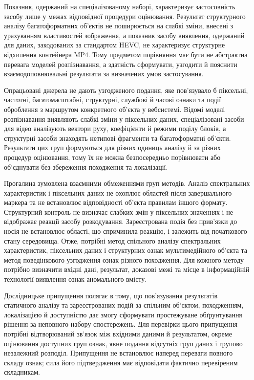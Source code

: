 Показник, одержаний на спеціалізованому наборі, характеризує застосовність засобу лише у межах відповідної процедури оцінювання. Результат структурного аналізу багатоформатних об’єктів не поширюється на слабкі зміни, внесені з урахуванням властивостей зображення, а показник засобу виявлення, одержаний для даних, закодованих за стандартом HEVC, не характеризує структурне відхилення контейнера MP4. Тому предметом порівняння має бути не абстрактна перевага моделей розпізнавання, а здатність сформувати, узгодити й пояснити взаємодоповнювальні результати за визначених умов застосування.

Опрацьовані джерела не дають узгодженого подання, яке пов’язувало б піксельні, частотні, багатомасштабні, структурні, службові й часові ознаки та події оброблення з маршрутом конкретного об’єкта у вебсистемі. Відомі моделі розпізнавання виявляють слабкі зміни у піксельних даних, спеціалізовані засоби для відео аналізують вектори руху, коефіцієнти й режими поділу блоків, а структурні засоби знаходять нетипові фрагменти та багатоформатні об’єкти. Результати цих груп формуються для різних одиниць аналізу й за різних процедур оцінювання, тому їх не можна безпосередньо порівнювати або об’єднувати без збереження походження та локалізації.

Прогалина зумовлена взаємними обмеженнями груп методів. Аналіз спектральних характеристик і піксельних даних не охоплює областей після завершального маркера та не встановлює відповідності об’єкта правилам іншого формату. Структурний контроль не визначає слабких змін у піксельних значеннях і не відображає реакції засобу розкодування. Зареєстрована подія без прив’язки до носія не встановлює області, що спричинила реакцію, і залежить від початкового стану середовища. Отже, потрібні метод спільного аналізу спектральних характеристик, піксельних даних і структурних ознак мультимедійного об’єкта та метод поведінкового узгодження ознак різного походження. Для кожного методу потрібно визначити вхідні дані, результат, доказові межі та місце в інформаційній технології виявлення ознак аномального вмісту.

Дослідницьке припущення полягає в тому, що пов’язування результатів статичного аналізу та зареєстрованих подій за спільним об’єктом, походженням, локалізацією й доступністю дає змогу сформувати простежуване обґрунтування рішення за неповного набору спостережень. Для перевірки цього припущення потрібні відтворюваний зв’язок між вхідними даними й результатом, окреме оцінювання доступних груп ознак, явне подання відсутніх груп даних і групово незалежний розподіл. Припущення не встановлює наперед переваги повного складу ознак; сила його підтвердження має відповідати фактично перевіреним складникам.

